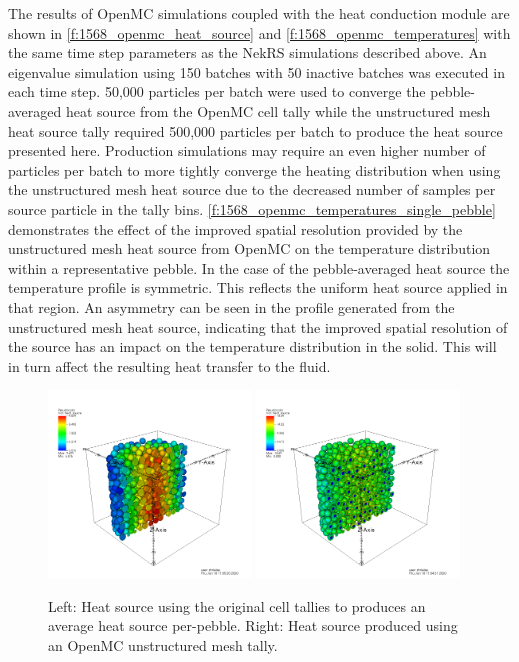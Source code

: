 The results of OpenMC simulations coupled with the heat conduction module are shown in \autoref{f:1568_openmc_heat_source} and \autoref{f:1568_openmc_temperatures} with the same time step parameters as the NekRS simulations described above.
An eigenvalue simulation using 150 batches with 50 inactive batches was executed in each time step.
50,000 particles per batch were used to converge the pebble-averaged heat source from the OpenMC cell tally while the unstructured mesh heat source tally required 500,000 particles per batch to produce the heat source presented here.
Production simulations may require an even higher number of particles per batch to more tightly converge the heating distribution when using the unstructured mesh heat source due to the decreased number of samples per source particle in the tally bins.
\autoref{f:1568_openmc_temperatures_single_pebble} demonstrates the effect of the improved spatial resolution provided by the unstructured mesh heat source from OpenMC on the temperature distribution within a representative pebble.
In the case of the pebble-averaged heat source the temperature profile is symmetric.
This reflects the uniform heat source applied in that region.
An asymmetry can be seen in the profile generated from the unstructured mesh heat source, indicating that the improved spatial resolution of the source has an impact on the temperature distribution in the solid.
This will in turn affect the resulting heat transfer to the fluid.

\begin{figure}[t!]
\centering
\includegraphics[clip=true,width=0.48\textwidth]{Figures/openmc_cell_heat_source}
\includegraphics[clip=true,width=0.48\textwidth]{Figures/openmc_mesh_heat_source}
\caption{Left: Heat source using the original cell tallies to produces an average heat source per-pebble. Right: Heat source produced using an OpenMC unstructured mesh tally.}
\label{f:1568_openmc_heat_source}
\end{figure}


